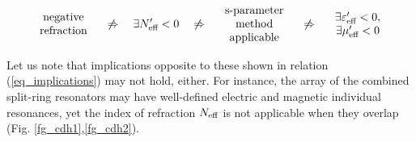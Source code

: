 


\begin{equation}
\begin{array}{c} \text{negative}\\ \text{refraction} \end{array}
\quad\not\Rightarrow\quad  \exists N_{\text{eff} }' < 0 
\quad\not\Rightarrow\quad \begin{array}{c} \text{s-parameter}\\ \text{method}\\ \text{applicable}  \end{array}
\quad\not\Rightarrow\quad \begin{array}{c} \exists \varepsilon_{\text{eff} }'<0,\\ \exists\mu_{\text{eff} }'<0  \end{array} 
\label{eq_implications}\end{equation} %

Let us note that implications opposite to these shown in relation (\ref{eq_implications}) may not hold, either.  For instance, the array of the combined split-ring resonators may have well-defined electric and magnetic individual resonances, yet the index of refraction $N_{\text{eff} }$ is not applicable when they overlap  (Fig. \ref{fg_cdh1},\ref{fg_cdh2}).





